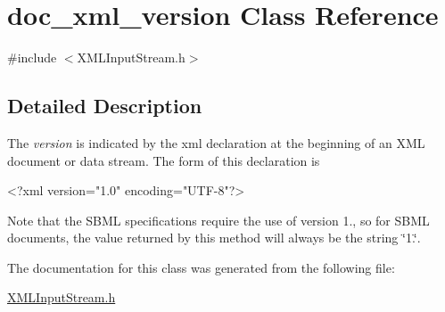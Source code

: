 \hypertarget{classdoc__xml__version}{}\section{doc\+\_\+xml\+\_\+version Class Reference}
\label{classdoc__xml__version}


{\ttfamily \#include $<$X\+M\+L\+Input\+Stream.\+h$>$}



\subsection{Detailed Description}
\begin{DoxyParagraph}{The {\itshape version} is indicated by the xml declaration at the}
beginning of an X\+ML document or data stream. The form of this declaration is \begin{DoxyVerb} <?xml version="1.0" encoding="UTF-8"?>
\end{DoxyVerb}
 Note that the S\+B\+ML specifications require the use of version 1., so for S\+B\+ML documents, the value returned by this method will always be the string {\ttfamily \char`\"{}1.\char`\"{}}. 
\end{DoxyParagraph}


The documentation for this class was generated from the following file\+:\begin{DoxyCompactItemize}
\item 
\hyperlink{_x_m_l_input_stream_8h}{X\+M\+L\+Input\+Stream.\+h}\end{DoxyCompactItemize}
